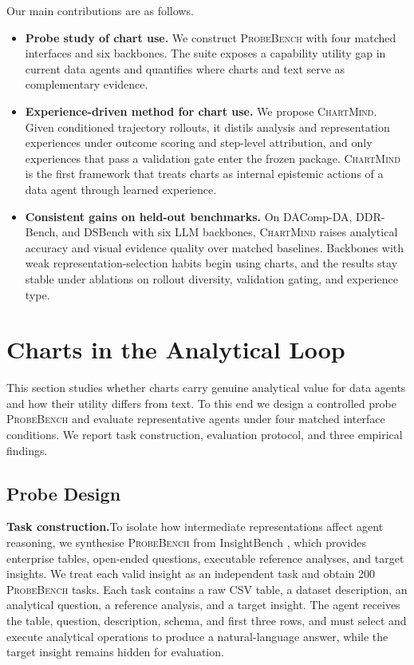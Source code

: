 \documentclass{article}
\newcommand{\method}{\textsc{ChartMind}\xspace}
\newcommand{\probe}{\textsc{ProbeBench}\xspace}
\newcommand{\stitle}[1]{\noindent\textbf{#1}}
\begin{document}
\noindent Our main contributions are as follows.
\begin{itemize}
\item \textbf{Probe study of chart use.} We construct \probe{} with four matched interfaces and six backbones. The suite exposes a capability utility gap in current data agents and quantifies where charts and text serve as complementary evidence.
\item \textbf{Experience-driven method for chart use.} We propose \method{}. Given conditioned trajectory rollouts, it distils analysis and representation experiences under outcome scoring and step-level attribution, and only experiences that pass a validation gate enter the frozen package. \method{} is the first framework that treats charts as internal epistemic actions of a data agent through learned experience.
\item \textbf{Consistent gains on held-out benchmarks.} On DAComp-DA, DDR-Bench, and DSBench with six LLM backbones, \method{} raises analytical accuracy and visual evidence quality over matched baselines. Backbones with weak representation-selection habits begin using charts, and the results stay stable under ablations on rollout diversity, validation gating, and experience type.
\end{itemize}

\section{Charts in the Analytical Loop}
\label{sec:probe}

\noindent This section studies whether charts carry genuine analytical value for data agents and how their utility differs from text. To this end we design a controlled probe \probe{} and evaluate representative agents under four matched interface conditions. We report task construction, evaluation protocol, and three empirical findings.

\subsection{Probe Design}
\label{sec:probe-setup}

\stitle{Task construction.}\quad To isolate how intermediate representations affect agent reasoning, we synthesise \probe{} from InsightBench \citep{sahu2025insightbench}, which provides enterprise tables, open-ended questions, executable reference analyses, and target insights. We treat each valid insight as an independent task and obtain 200 \probe{} tasks. Each task contains a raw CSV table, a dataset description, an analytical question, a reference analysis, and a target insight. The agent receives the table, question, description, schema, and first three rows, and must select and execute analytical operations to produce a natural-language answer, while the target insight remains hidden for evaluation.
\end{document}
